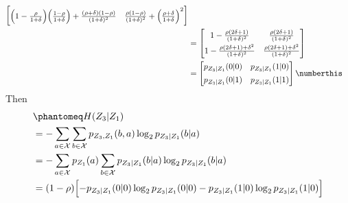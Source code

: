 \documentclass[
  coursecode={MTHE 474},
  assignmentname={Homework \homeworknumber},
  studentnumber=20053722,
  name={Bryan Hoang},
  draft,
]{
  ltxanswer%
}
\begin{document}
\begin{questions}
\begin{parts}
\begin{solution}
\begin{align*}
\begin{bmatrix}
                            \Bigl(1-\frac{\rho}{1+\delta}\Bigr)\Bigl(\frac{1-\rho}{1+\delta}\Bigr) + \frac{(\rho+\delta)(1-\rho)}{(1+\delta)^2} & \frac{\rho(1-\rho)}{(1+\delta)^2} + \Bigl(\frac{\rho+\delta}{1+\delta}\Bigr)^2
                          \end{bmatrix} \\
                       &= \begin{bmatrix}
                            1-\frac{\rho(2\delta+1)}{(1+\delta)^2}          & \frac{\rho(2\delta+1)}{(1+\delta)^2}          \\[1ex]
                            1-\frac{\rho(2\delta+1)+\delta^2}{(1+\delta)^2} & \frac{\rho(2\delta+1)+\delta^2}{(1+\delta)^2}
                          \end{bmatrix}                                                                                                      \\
                       &= \begin{bmatrix}
                            p_{Z_{3}|Z_{1}} (0|0) & p_{Z_{3}|Z_{1}} (1|0) \\[1ex]
                            p_{Z_{3}|Z_{1}} (0|1) & p_{Z_{3}|Z_{1}} (1|1)
                          \end{bmatrix}\numberthis\label{eq:transition-matrix}
        \end{align*}
        Then
        \begin{align*}
           &\phantomeq H(Z_{3}|Z_{1})                                                                                                                                                                                                                           \\
           &= -\sum_{a\in\mathcal{X}}\sum_{b\in\mathcal{X}} p_{Z_{3},Z_{1}}(b,a)\log_{2}p_{Z_{3}|Z_{1}}(b|a)                                                                                                                                                    \\
           &= -\sum_{a\in\mathcal{X}}p_{Z_{1}}(a)\sum_{b\in\mathcal{X}} p_{Z_{3}|Z_{1}}(b|a)\log_{2}p_{Z_{3}|Z_{1}}(b|a)                                                                                                                                        \\
           &= (1-\rho)\Bigl[-p_{Z_{3}|Z_{1}}(0|0)\log_{2}p_{Z_{3}|Z_{1}}(0|0) - p_{Z_{3}|Z_{1}}(1|0)\log_{2}p_{Z_{3}|Z_{1}}(1|0)\Bigr]                                                                                                                          \\

\end{align*}
\end{solution}
\end{parts}
\end{questions}
\end{document}
